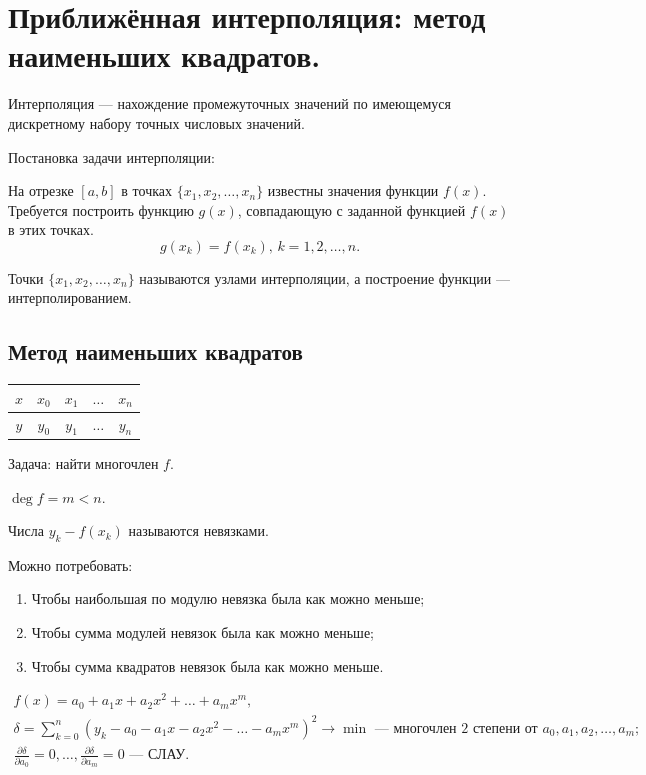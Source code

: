 \section{Приближённая интерполяция: метод наименьших квадратов.}

Интерполяция --- нахождение промежуточных значений по имеющемуся дискретному набору точных числовых значений. 

Постановка задачи интерполяции:

На отрезке $[a, b]$ в точках $\{x_1, x_2, \dotsc, x_n\}$ известны значения функции $f(x)$. Требуется построить функцию $g(x)$, совпадающую с заданной функцией $f(x)$ в этих точках.
\begin{equation*}
	g(x_k) = f(x_k), \, k = 1, 2, \dotsc, n.
\end{equation*}

Точки $\{x_1, x_2, \dotsc, x_n\}$ называются узлами интерполяции, а построение функции --- интерполированием. 

\subsection*{Метод наименьших квадратов}

\begin{table}[H]
	\centering
	\begin{tabular}{|c|c|c|c|c|}
		\hline
		{$x$} & {$x_0$} & {$x_1$} & {$\dotsc$} & {$x_n$} \\ \hline 
		{$y$} & {$y_0$} & {$y_1$} & {$\dotsc$} & {$y_n$} \\ \hline 
	\end{tabular}
\end{table}

Задача: найти многочлен $f$.

$\deg{f} = m < n$.

Числа $y_k - f(x_k)$ называются невязками. 

Можно потребовать:
\begin{enumerate}
	\item Чтобы наибольшая по модулю невязка была как можно меньше;
	
	\item Чтобы сумма модулей невязок была как можно меньше;
	
	\item Чтобы сумма квадратов невязок была как можно меньше.
\end{enumerate}
\begin{gather*}
	f(x) = a_0 + a_1 x + a_2 x^2 + \dotsc + a_m x^m, \\
	\delta = \sum\limits_{k = 0}^{n}(y_{k} - a_0 - a_1 x - a_2 x^2 - \dotsc - a_m x^m)^2 \to \min \text{ --- многочлен 2 степени от } a_0, a_1, a_2, \dotsc, a_m; \\
	\frac{\partial \delta}{\partial a_0} = 0, \dotsc, \frac{\partial \delta}{\partial a_m} = 0 \text{ --- СЛАУ}.
\end{gather*}


